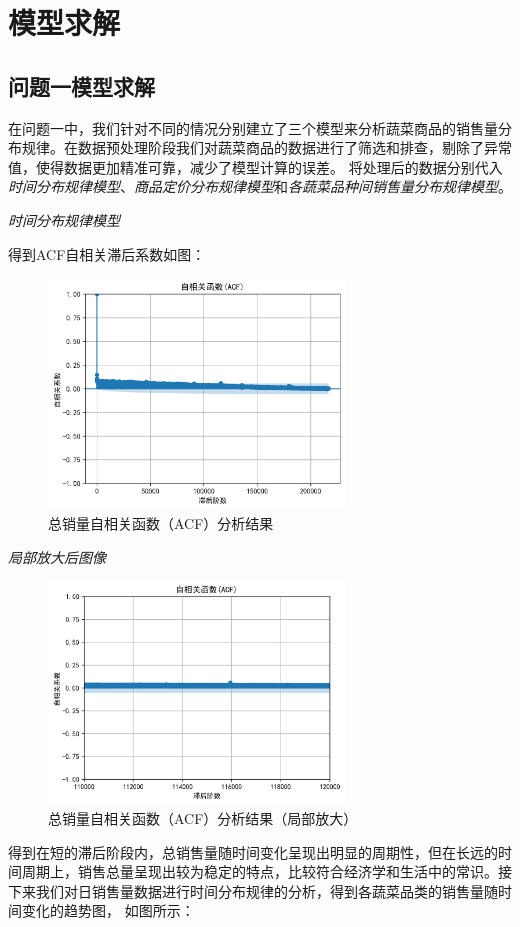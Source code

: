 \documentclass{article}
\begin{document}
\section{模型求解}



\subsection{问题一模型求解}
在问题一中，我们针对不同的情况分别建立了三个模型来分析蔬菜商品的销售量分布规律。在数据预处理阶段我们对蔬菜商品的数据进行了筛选和排查，剔除了异常值，使得数据更加精准可靠，减少了模型计算的误差。
将处理后的数据分别代入\textit{时间分布规律模型}、\textit{商品定价分布规律模型}和\textit{各蔬菜品种间销售量分布规律模型}。

\textit{时间分布规律模型}

得到ACF自相关滞后系数如图：
\begin{figure}[H]
    \centering
    \includegraphics[width=0.7\textwidth]{calc_ACF/ACF_plot.png}
    \caption{总销量自相关函数（ACF）分析结果}
    \label{fig:acf}
\end{figure}
\textit{局部放大后图像}
\begin{figure}[H]
    \centering
    \includegraphics[width=0.7\textwidth]{calc_ACF/ACF_plot_zoomed.png}
    \caption{总销量自相关函数（ACF）分析结果（局部放大）}
    \label{fig:acf_zoomed}
\end{figure}
得到在短的滞后阶段内，总销售量随时间变化呈现出明显的周期性，但在长远的时间周期上，销售总量呈现出较为稳定的特点，比较符合经济学和生活中的常识。接下来我们对日销售量数据进行时间分布规律的分析，得到各蔬菜品类的销售量随时间变化的趋势图，
如图所示：
\end{document}

